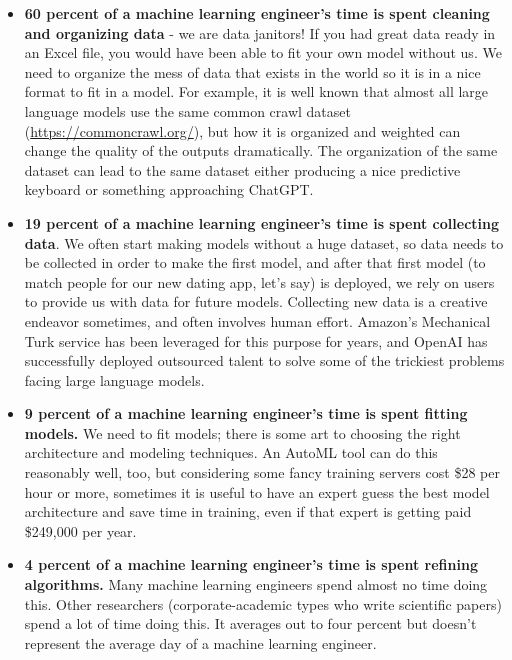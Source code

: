 \begin{itemize}
    \item \textbf{60 percent of a machine learning engineer's time is spent cleaning and organizing data} - we are data janitors! If you had great data ready in an Excel file, you would have been able to fit your own model without us. We need to organize the mess of data that exists in the world so it is in a nice format to fit in a model. For example, it is well known that almost all large language models use the same common crawl dataset (\url{https://commoncrawl.org/}), but how it is organized and weighted can change the quality of the outputs dramatically. The organization of the same dataset can lead to the same dataset either producing a nice predictive keyboard or something approaching ChatGPT.
    \item \textbf{19 percent of a machine learning engineer's time is spent collecting data}. We often start making models without a huge dataset, so data needs to be collected in order to make the first model, and after that first model (to match people for our new dating app, let's say) is deployed, we rely on users to provide us with data for future models. Collecting new data is a creative endeavor sometimes, and often involves human effort. Amazon's Mechanical Turk service has been leveraged for this purpose for years, and OpenAI has successfully deployed outsourced talent to solve some of the trickiest problems facing large language models.
    \item \textbf{9 percent of a machine learning engineer's time is spent fitting models.} We need to fit models; there is some art to choosing the right architecture and modeling techniques. An AutoML tool can do this reasonably well, too, but considering some fancy training servers cost \$28 per hour or more, sometimes it is useful to have an expert guess the best model architecture and save time in training, even if that expert is getting paid \$249,000 per year.
    \item \textbf{4 percent of a machine learning engineer's time is spent refining algorithms.} Many machine learning engineers spend almost no time doing this. Other researchers (corporate-academic types who write scientific papers) spend a lot of time doing this. It averages out to four percent but doesn't represent the average day of a machine learning engineer.
\end{itemize}

